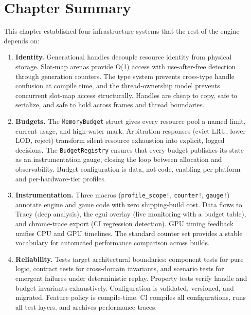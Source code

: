 \documentclass[
  11pt,
  letterpaper,
  DIV=11,
  numbers=noendperiod,
  twoside,
  open=right]{scrreprt}
\begin{document}
\section*{Chapter Summary}\label{chapter-summary-5}


This chapter established four infrastructure systems that the rest of
the engine depends on:

\begin{enumerate}
\def\labelenumi{\arabic{enumi}.}
\item
  \textbf{Identity.} Generational handles decouple resource identity
  from physical storage. Slot-map arenas provide O(1) access with
  use-after-free detection through generation counters. The type system
  prevents cross-type handle confusion at compile time, and the
  thread-ownership model prevents concurrent slot-map access
  structurally. Handles are cheap to copy, safe to serialize, and safe
  to hold across frames and thread boundaries.
\item
  \textbf{Budgets.} The \texttt{MemoryBudget} struct gives every
  resource pool a named limit, current usage, and high-water mark.
  Arbitration responses (evict LRU, lower LOD, reject) transform silent
  resource exhaustion into explicit, logged decisions. The
  \texttt{BudgetRegistry} ensures that every budget publishes its state
  as an instrumentation gauge, closing the loop between allocation and
  observability. Budget configuration is data, not code, enabling
  per-platform and per-hardware-tier profiles.
\item
  \textbf{Instrumentation.} Three macros (\texttt{profile\_scope!},
  \texttt{counter!}, \texttt{gauge!}) annotate engine and game code with
  zero shipping-build cost. Data flows to Tracy (deep analysis), the
  egui overlay (live monitoring with a budget table), and chrome-trace
  export (CI regression detection). GPU timing feedback unifies CPU and
  GPU timelines. The standard counter set provides a stable vocabulary
  for automated performance comparison across builds.
\item
  \textbf{Reliability.} Tests target architectural boundaries: component
  tests for pure logic, contract tests for cross-domain invariants, and
  scenario tests for emergent failures under deterministic replay.
  Property tests verify handle and budget invariants exhaustively.
  Configuration is validated, versioned, and migrated. Feature policy is
  compile-time. CI compiles all configurations, runs all test layers,
  and archives performance traces.
\end{enumerate}
\end{document}
